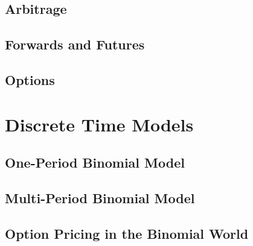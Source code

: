 \documentclass[11pt,fleqn]{book} %
\begin{document}

\section{Arbitrage}


\section{Forwards and Futures}


\section{Options}



\chapter{Discrete Time Models}


\section{One-Period Binomial Model}


\section{Multi-Period Binomial Model}


\section{Option Pricing in the Binomial World}
\end{document}
